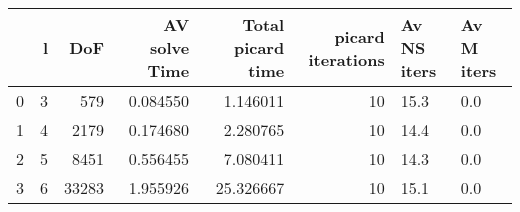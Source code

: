 \begin{tabular}{lrrrrrll}
\toprule
{} &  l &    DoF &  AV solve Time &  Total picard time &  picard iterations & Av NS iters & Av M iters \\
\midrule
0 &  3 &    579 &       0.084550 &           1.146011 &                 10 &        15.3 &        0.0 \\
1 &  4 &   2179 &       0.174680 &           2.280765 &                 10 &        14.4 &        0.0 \\
2 &  5 &   8451 &       0.556455 &           7.080411 &                 10 &        14.3 &        0.0 \\
3 &  6 &  33283 &       1.955926 &          25.326667 &                 10 &        15.1 &        0.0 \\
\bottomrule
\end{tabular}
